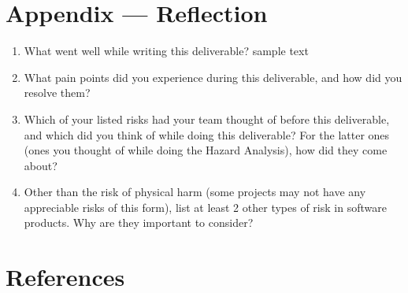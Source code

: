 \documentclass{article}
\begin{document}
\newpage{}

\section*{Appendix --- Reflection}




\begin{enumerate}
    \item What went well while writing this deliverable? sample text
    \item What pain points did you experience during this deliverable, and how
    did you resolve them?
    \item Which of your listed risks had your team thought of before this
    deliverable, and which did you think of while doing this deliverable? For
    the latter ones (ones you thought of while doing the Hazard Analysis), how
    did they come about?
    \item Other than the risk of physical harm (some projects may not have any
    appreciable risks of this form), list at least 2 other types of risk in
    software products. Why are they important to consider?
\end{enumerate}

\section{References}
\sloppy
\end{document}
